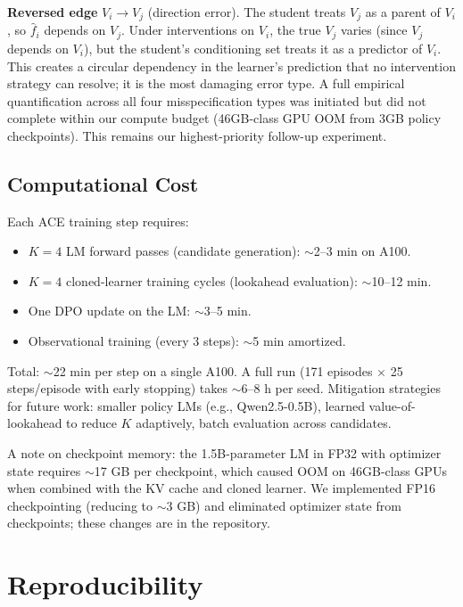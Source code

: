 \textbf{Reversed edge} $V_i \to V_j$ (direction error). The student treats $V_j$ as a parent of $V_i$, so $\hat{f}_i$ depends on $V_j$. Under interventions on $V_i$, the true $V_j$ varies (since $V_j$ depends on $V_i$), but the student's conditioning set treats it as a predictor of $V_i$. This creates a circular dependency in the learner's prediction that no intervention strategy can resolve; it is the most damaging error type. A full empirical quantification across all four misspecification types was initiated but did not complete within our compute budget (46GB-class GPU OOM from 3GB policy checkpoints). This remains our highest-priority follow-up experiment.

\subsection{Computational Cost}
\label{app:compute}

Each ACE training step requires:
\begin{itemize}[leftmargin=1.2em,topsep=0.2em,itemsep=0.1em]
\item $K=4$ LM forward passes (candidate generation): $\sim$2--3 min on A100.
\item $K=4$ cloned-learner training cycles (lookahead evaluation): $\sim$10--12 min.
\item One DPO update on the LM: $\sim$3--5 min.
\item Observational training (every 3 steps): $\sim$5 min amortized.
\end{itemize}
Total: $\sim$22 min per step on a single A100. A full run (171 episodes $\times$ 25 steps/episode with early stopping) takes $\sim$6--8 h per seed. Mitigation strategies for future work: smaller policy LMs (e.g., Qwen2.5-0.5B), learned value-of-lookahead to reduce $K$ adaptively, batch evaluation across candidates.

A note on checkpoint memory: the 1.5B-parameter LM in FP32 with optimizer state requires $\sim$17 GB per checkpoint, which caused OOM on 46GB-class GPUs when combined with the KV cache and cloned learner. We implemented FP16 checkpointing (reducing to $\sim$3 GB) and eliminated optimizer state from checkpoints; these changes are in the repository.

\section{Reproducibility}
\label{app:reproducibility}

